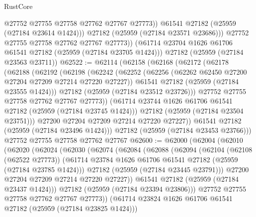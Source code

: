 \begin{lexlean}{RustCore}
\begin{coremodule}
                @27752
                @27755
                @27758
                @27762
                @27767
                @27773))
            @61541
            @27182
            (@25959 (@27184 @23614 @1424)))
          @27182
          (@25959 (@27184 @23571 @23686)))
        @27752
        @27755
        @27758
        @27762
        @27767
        @27773))
    (@61714 @23704 @1626 @61706 @61541 @27182 (@25959 (@27184 @23705 @1424)))
    @27182
    (@25959 (@27184 @23563 @23711))
@62522 := @62114
    (@62158
      (@62168
        (@62172
          (@62178
            (@62188
              (@62192
                (@62198
                  (@62242
                    (@62252
                      (@62256 (@62262 @62450 @27200 @27204 @27209 @27214 @27220 @27227))
                      @61541
                      @27182
                      (@25959 (@27184 @23555 @1424)))
                    @27182
                    (@25959 (@27184 @23512 @23726)))
                  @27752
                  @27755
                  @27758
                  @27762
                  @27767
                  @27773))
              (@61714 @23744 @1626 @61706 @61541 @27182 (@25959 (@27184 @23745 @1424)))
              @27182
              (@25959 (@27184 @23504 @23751)))
            @27200
            @27204
            @27209
            @27214
            @27220
            @27227))
        @61541
        @27182
        (@25959 (@27184 @23496 @1424)))
      @27182
      (@25959 (@27184 @23453 @23766)))
    @27752
    @27755
    @27758
    @27762
    @27767
@62600 := @62000
    (@62004
      (@62010
        (@62020
          (@62024
            (@62030
              (@62074
                (@62084
                  (@62088
                    (@62094
                      (@62104
                        (@62108 (@62522 @27773))
                        (@61714 @23784 @1626 @61706 @61541 @27182 (@25959 (@27184 @23785 @1424)))
                        @27182
                        (@25959 (@27184 @23445 @23791)))
                      @27200
                      @27204
                      @27209
                      @27214
                      @27220
                      @27227))
                  @61541
                  @27182
                  (@25959 (@27184 @23437 @1424)))
                @27182
                (@25959 (@27184 @23394 @23806)))
              @27752
              @27755
              @27758
              @27762
              @27767
              @27773))
          (@61714 @23824 @1626 @61706 @61541 @27182 (@25959 (@27184 @23825 @1424)))

\end{coremodule}
\end{lexlean}
